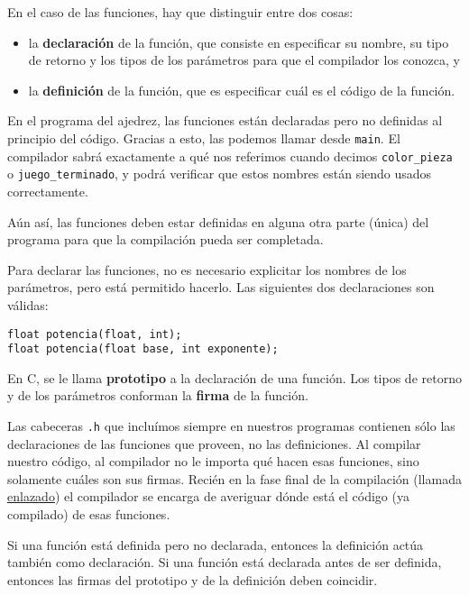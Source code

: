 En el caso de las funciones, hay que distinguir entre dos cosas:

\begin{itemize}
\item
  la \textbf{declaración} de la función, que consiste en especificar su
  nombre, su tipo de retorno y los tipos de los parámetros para que el
  compilador los conozca, y
\item
  la \textbf{definición} de la función, que es especificar cuál es el
  código de la función.
\end{itemize}

En el programa del ajedrez, las funciones están declaradas pero no
definidas al principio del código. Gracias a esto, las podemos llamar
desde \lstinline!main!. El compilador sabrá exactamente a qué nos
referimos cuando decimos \lstinline!color_pieza! o
\lstinline!juego_terminado!, y podrá verificar que estos nombres están
siendo usados correctamente.

Aún así, las funciones deben estar definidas en alguna otra parte
(única) del programa para que la compilación pueda ser completada.

Para declarar las funciones, no es necesario explicitar los nombres de
los parámetros, pero está permitido hacerlo. Las siguientes dos
declaraciones son válidas:

\begin{lstlisting}
float potencia(float, int);
float potencia(float base, int exponente);
\end{lstlisting}

En C, se le llama \textbf{prototipo} a la declaración de una función.
Los tipos de retorno y de los parámetros conforman la \textbf{firma} de
la función.

Las cabeceras \lstinline!.h! que incluímos siempre en nuestros programas
contienen sólo las declaraciones de las funciones que proveen, no las
definiciones. Al compilar nuestro código, al compilador no le importa
qué hacen esas funciones, sino solamente cuáles son sus firmas. Recién
en la fase final de la compilación (llamada
\href{http://en.wikipedia.org/wiki/Linker\_(computing)}{enlazado}) el
compilador se encarga de averiguar dónde está el código (ya compilado)
de esas funciones.

Si una función está definida pero no declarada, entonces la definición
actúa también como declaración. Si una función está declarada antes de
ser definida, entonces las firmas del prototipo y de la definición deben
coincidir.

